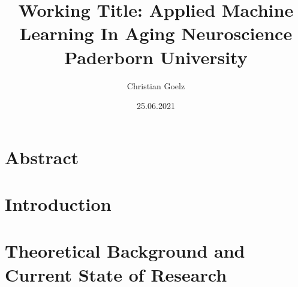 \documentclass[12pt]{report}
\title{
    {Working Title: Applied Machine Learning In Aging Neuroscience}\\
    {\large Paderborn University}\\
}
\author{Christian Goelz}
\date{25.06.2021}
\begin{document}
    \maketitle

    \chapter*{Abstract}
    
    
    \chapter*{Introduction}
    

    \chapter*{Theoretical Background and Current State of Research}
    
\end{document}
